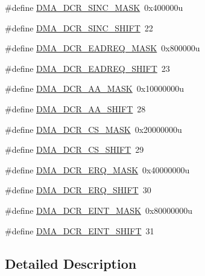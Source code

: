 \begin{DoxyCompactItemize}
\item 
\#define \hyperlink{group___d_m_a___register___masks_ga5fff4a843815ef45cffdc31104379644}{D\+M\+A\+\_\+\+D\+C\+R\+\_\+\+S\+I\+N\+C\+\_\+\+M\+A\+SK}~0x400000u
\item 
\#define \hyperlink{group___d_m_a___register___masks_gad73f08f2770d56b3d6fd8bf6b9ff1cb9}{D\+M\+A\+\_\+\+D\+C\+R\+\_\+\+S\+I\+N\+C\+\_\+\+S\+H\+I\+FT}~22
\item 
\#define \hyperlink{group___d_m_a___register___masks_ga69c12559da76c7de9d21298f3a8815f4}{D\+M\+A\+\_\+\+D\+C\+R\+\_\+\+E\+A\+D\+R\+E\+Q\+\_\+\+M\+A\+SK}~0x800000u
\item 
\#define \hyperlink{group___d_m_a___register___masks_gac11bbaa46006b670a6e2dcd34bd28dde}{D\+M\+A\+\_\+\+D\+C\+R\+\_\+\+E\+A\+D\+R\+E\+Q\+\_\+\+S\+H\+I\+FT}~23
\item 
\#define \hyperlink{group___d_m_a___register___masks_gaa6a92e7768984e640413eea5ef5da08b}{D\+M\+A\+\_\+\+D\+C\+R\+\_\+\+A\+A\+\_\+\+M\+A\+SK}~0x10000000u
\item 
\#define \hyperlink{group___d_m_a___register___masks_gafe71d9df8ce9ecf93c694cd325f50309}{D\+M\+A\+\_\+\+D\+C\+R\+\_\+\+A\+A\+\_\+\+S\+H\+I\+FT}~28
\item 
\#define \hyperlink{group___d_m_a___register___masks_ga3c0beb03627ee2982c2fd1d332118d7f}{D\+M\+A\+\_\+\+D\+C\+R\+\_\+\+C\+S\+\_\+\+M\+A\+SK}~0x20000000u
\item 
\#define \hyperlink{group___d_m_a___register___masks_gaa453b5d53f87d5534ca546c4c6bef60f}{D\+M\+A\+\_\+\+D\+C\+R\+\_\+\+C\+S\+\_\+\+S\+H\+I\+FT}~29
\item 
\#define \hyperlink{group___d_m_a___register___masks_gaf7a7b51a343f7ce8a595f528aae583be}{D\+M\+A\+\_\+\+D\+C\+R\+\_\+\+E\+R\+Q\+\_\+\+M\+A\+SK}~0x40000000u
\item 
\#define \hyperlink{group___d_m_a___register___masks_gafc3838d15550b818d421a160ea57a247}{D\+M\+A\+\_\+\+D\+C\+R\+\_\+\+E\+R\+Q\+\_\+\+S\+H\+I\+FT}~30
\item 
\#define \hyperlink{group___d_m_a___register___masks_gac5427564104425fdb45a492386cf05e7}{D\+M\+A\+\_\+\+D\+C\+R\+\_\+\+E\+I\+N\+T\+\_\+\+M\+A\+SK}~0x80000000u
\item 
\#define \hyperlink{group___d_m_a___register___masks_gaee74e1c480eec935c3864d892445db29}{D\+M\+A\+\_\+\+D\+C\+R\+\_\+\+E\+I\+N\+T\+\_\+\+S\+H\+I\+FT}~31
\end{DoxyCompactItemize}


\subsection{Detailed Description}


